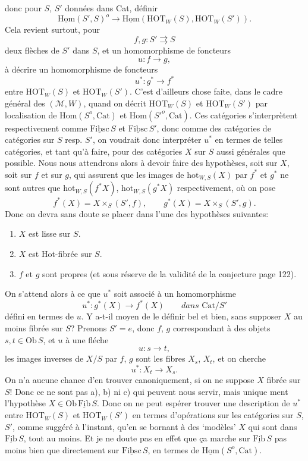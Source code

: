 \documentclass[11pt]{article}
\newcommand{\printedpage}[1]{\marginpar{\footnotesize p.~#1}}
\newcommand{\msp}[1]{\marginpar{\footnotesize [#1]}}
\newcommand{\HOT}{\mathrm{HOT}}
\newcommand{\Cat}{\mathrm{Cat}}
\newcommand{\Ob}{\mathrm{Ob}}
\newcommand{\hot}{\mathrm{hot}}
\newcommand{\uHom}{\underline{\mathrm{Hom}}}
\newcommand{\uFib}{\underline{\mathrm{Fib}}}
\newcommand{\uFibsc}{\underline{\mathrm{Fibsc}}}
\begin{document}
\printedpage{79}

donc pour $S$, $S'$ données dans Cat, définir
\[ \uHom(S',S)^o \longrightarrow \uHom(\HOT_W(S),\HOT_W(S')). \]
Cela revient surtout, pour
\[ f,g : S' \rightrightarrows S \]
deux flèches de $S'$ dans $S$, et un homomorphisme de foncteurs
\[ u : f \longrightarrow g, \]
à décrire un homomorphisme de foncteurs
\[ u^* : g^* \longrightarrow f^* \]
entre $\HOT_W(S)$ et $\HOT_W(S')$. C'est d'ailleurs chose faite, dans le cadre général des $(\mathcal{M},W)$, quand on décrit $\HOT_W(S)$ et $\HOT_W(S')$ par localisation de $\mathrm{Hom}(S^o,\Cat)$ et $\mathrm{Hom}(S'^o,\Cat)$. Ces catégories s'interprètent respectivement comme $\uFibsc\,S$ et $\uFibsc\,S'$, donc comme des catégories de catégories sur $S$ resp. $S'$, on voudrait donc interpréter $u^*$ en termes de telles catégories, et tant qu'à faire, pour des catégories $X$ sur $S$ aussi générales que possible. Nous nous
\msp{page 129}
attendrons alors à devoir faire des hypothèses, soit sur $X$, soit sur $f$ et sur $g$, qui assurent que les images de $\hot_{W,S}(X)$ par $f^*$ et $g^*$ ne sont autres que $\hot_{W,S}(f^*X)$, $\hot_{W,S}(g^*X)$ respectivement, où on pose
\[ f^*(X) = X \times_S (S',f), \qquad g^*(X) = X \times_S (S',g). \]
Donc on devra sans doute se placer dans l'une des hypothèses suivantes:
\begin{enumerate}
\item[a)] $X$ est lisse sur $S$.
\item[b)] $X$ est Hot-fibrée sur $S$.
\item[c)] $f$ et $g$ sont propres (et sous réserve de la validité de la conjecture page 122).
\end{enumerate}
On s'attend alors à ce que $u^*$ soit associé à un homomorphisme
\[ u^* : g^*(X) \longrightarrow f^*(X) \qquad \textit{dans } \Cat/S' \]
défini en termes de $u$. Y a-t-il moyen de le définir bel et bien, sans supposer $X$ au moins fibrée sur $S$? Prenons $S'=e$, donc $f$, $g$ correspondant à des objets $s,t\in\Ob\,S$, et $u$ à une fléche %
\[ u : s \longrightarrow t, \]
les images inverses de $X/S$ par $f$, $g$ sont les fibres $X_s$, $X_t$, et on cherche
\[ u^* : X_t \longrightarrow X_s. \]
On n'a aucune chance d'en trouver canoniquement, si on ne suppose $X$ fibrée sur $S$! Donc ce ne sont pas a), b) ni c) qui peuvent nous servir, mais unique%
\printedpage{80}%
\msp{page 130}%
ment l'hypothèse $X\in\Ob\,\uFib\,S$. Donc on ne peut espérer trouver une description de $u^*$ entre $\HOT_W(S)$ et $\HOT_W(S')$ en termes d'opérations sur les catégories sur $S$, $S'$, comme suggéré à l'instant, qu'en se bornant à des `modèles' $X$ qui sont dans $\uFib\,S$, tout au moins. Et je ne doute pas en effet que ça marche sur $\uFib\,S$ pas moins bien que directement sur $\uFibsc\,S$, en termes de $\uHom(S^o,\Cat)$.
\end{document}
